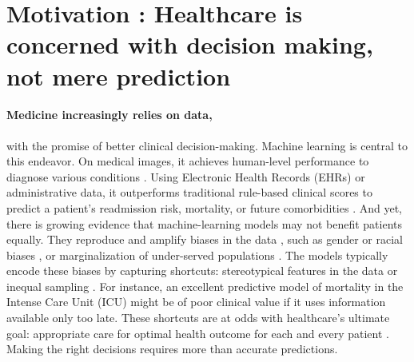 \documentclass[french,12pt,twoside,a4paper]{book}
\begin{document}
\clearpage
\minitoc

\section{Motivation : Healthcare is concerned with decision making, not mere
  prediction}%
\label{sec:causal_tuto:motivation}%


\label{subsec:causal_tuto:synthetic_materials}%


\paragraph{Medicine increasingly relies on data,} with the promise of better
clinical decision-making. Machine learning is central to this endeavor.
On medical images, it achieves human-level performance to
diagnose various conditions
\citep{aggarwal2021diagnostic,esteva2021deep,liu2019comparison}.
Using Electronic Health Records (EHRs) or administrative data, it
outperforms traditional rule-based clinical scores to predict a patient's
readmission risk, mortality, or future comorbidities
\citep{rajkomar2018scalable,li2020behrt,beaulieu2021machine}.
%
And yet, there is growing evidence that machine-learning models may not benefit
patients equally. They reproduce and amplify biases in the data
\citep{rajkomar2018ensuring}, such as gender or racial biases
\citep{singh2022generalizability,gichoya2022ai,roosli2022peeking},
or marginalization of under-served populations
\citep{seyyed2021underdiagnosis}. The models
typically encode these biases by capturing shortcuts: stereotypical features in the data or inequal sampling \citep{geirhos2020shortcut,winkler2019association,degrave2021ai}.
%
For instance, an excellent predictive model of mortality in the Intense Care Unit
(ICU) might be of poor clinical value if it uses information available
only too late.
%
These shortcuts are at odds with healthcare's ultimate goal: appropriate care
for optimal health outcome for each and every patient
\citep{cma_policy_appropriateness_2015, ghassemi2020review}. Making the right decisions requires more than accurate predictions.
\end{document}
